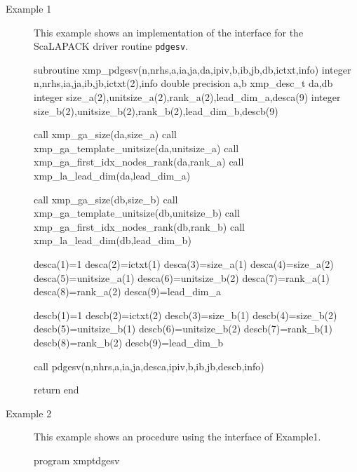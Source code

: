 \begin{description}

 \item[Example 1]
	    This example shows an implementation of the interface for
	    the ScaLAPACK driver routine {\tt pdgesv}.

\begin{XFexample}
      subroutine xmp_pdgesv(n,nrhs,a,ia,ja,da,ipiv,b,ib,jb,db,ictxt,info)
      integer n,nrhs,ia,ja,ib,jb,ictxt(2),info
      double precision a,b
      xmp_desc_t da,db
      integer size_a(2),unitsize_a(2),rank_a(2),lead_dim_a,desca(9)
      integer size_b(2),unitsize_b(2),rank_b(2),lead_dim_b,descb(9)
      
      call xmp_ga_size(da,size_a)
      call xmp_ga_template_unitsize(da,unitsize_a)
      call xmp_ga_first_idx_nodes_rank(da,rank_a)
      call xmp_la_lead_dim(da,lead_dim_a)
      
      call xmp_ga_size(db,size_b)
      call xmp_ga_template_unitsize(db,unitsize_b)
      call xmp_ga_first_idx_nodes_rank(db,rank_b)
      call xmp_la_lead_dim(db,lead_dim_b)
      
      desca(1)=1
      desca(2)=ictxt(1)
      desca(3)=size_a(1)
      desca(4)=size_a(2)
      desca(5)=unitsize_a(1)
      desca(6)=unitsize_b(2)
      desca(7)=rank_a(1)
      desca(8)=rank_a(2)
      desca(9)=lead_dim_a
      
      descb(1)=1
      descb(2)=ictxt(2)
      descb(3)=size_b(1)
      descb(4)=size_b(2)
      descb(5)=unitsize_b(1)
      descb(6)=unitsize_b(2)
      descb(7)=rank_b(1)
      descb(8)=rank_b(2)
      descb(9)=lead_dim_b
      
      call pdgesv(n,nhrs,a,ia,ja,desca,ipiv,b,ib,jb,descb,info)
      
      return
      end

\end{XFexample}


\item[Example 2]
	   This example shows an {\XMP} procedure using the interface of
	   Example1.

\begin{XFexample}
      program xmptdgesv


\end{XFexample}
\end{description}
